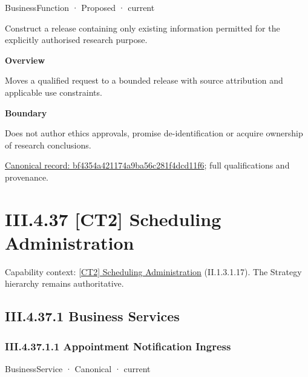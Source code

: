 \label{element:bf4354a421174a9ba56c281f4dcd11f6}
{\small BusinessFunction · Proposed · current}\par

Construct a release containing only existing information permitted for the explicitly authorised research purpose.



\textbf{Overview}



Moves a qualified request to a bounded release with source attribution and applicable use constraints.



\textbf{Boundary}



Does not author ethics approvals, promise de-identification or acquire ownership of research conclusions.


{\footnotesize \href{../../../../continuum/business/business-function/bf4354a421174a9ba56c281f4dcd11f6.md}{Canonical record: bf4354a421174a9ba56c281f4dcd11f6}; full qualifications and provenance.}\par
\section*{III.4.37 [CT2] Scheduling Administration}
\label{navigation:III.4.37}

{\small Capability context: \hyperref[element:35fb3744c900470f9895056246a13fb1]{[CT2] Scheduling Administration} (II.1.3.1.17). The Strategy hierarchy remains authoritative.}\par
\subsection*{III.4.37.1 Business Services}
\label{navigation:III.4.37.1}

\subsubsection*{III.4.37.1.1 Appointment Notification Ingress}
\label{navigation:III.4.37.1.1}

\label{element:67045c71e2194f6ba19002edcea94ee0}
{\small BusinessService · Canonical · current}\par

